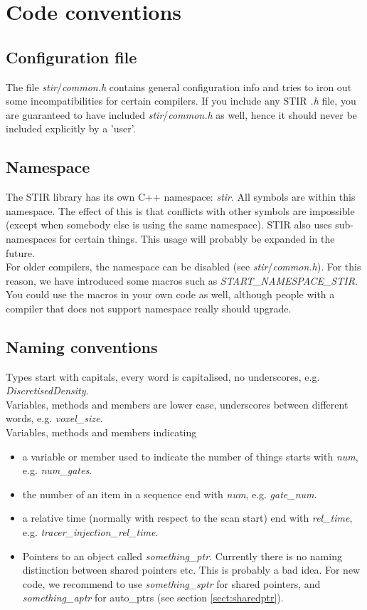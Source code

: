 \documentclass{article}
\begin{document}
\section{
Code conventions}


\subsection{
Configuration file}

The file \textit{stir}/\textit{common.h} contains general configuration 
info and tries to iron out some incompatibilities for certain 
compilers. If you include any STIR \textit{.h} file, you are guaranteed 
to have included \textit{stir}/\textit{common.h} as well, hence it should 
never be included explicitly by a 'user'.

\subsection{
Namespace}

The STIR library has its own C++ namespace: \textit{stir}. All symbols 
are within this namespace. The effect of this is that conflicts 
with other symbols are impossible (except when somebody else 
is using the same namespace). STIR also uses sub-namespaces for 
certain things. This usage will probably be expanded in the future.\\
For older compilers, the namespace can be disabled (see \textit{stir}/\textit{common.h}). 
For this reason, we have introduced some macros such as \textit{START\_NAMESPACE\_STIR.} You 
could use the macros in your own code as well, although people 
with a compiler that does not support namespace really should 
upgrade.

\subsection{
Naming conventions }

Types start with capitals, every word is capitalised, no underscores, 
e.g. \textit{DiscretisedDensity}.\\
Variables, methods and members are lower case, underscores between 
different words, e.g. \textit{voxel\_size}.\\
Variables, methods and members indicating 
\begin{itemize}
\item 
a variable or member used to indicate the number of things starts 
with \textit{num}, e.g. \textit{num\_gates}.
\item 
the number of an item in a sequence end with \textit{num}, e.g. \textit{gate\_num}.
\item 
a relative time (normally with respect to the scan start) end 
with \textit{rel\_time}, e.g. \textit{tracer\_injection\_rel\_time}.
\item 
Pointers to an object called \textit{something\_ptr}. Currently there 
is no naming distinction between shared pointers etc. This is 
probably a bad idea. For new code, we recommend to use \textit{something\_sptr} 
for shared pointers, and \textit{something\_aptr} for auto\_ptrs (see 
section \ref{sect:sharedptr}).
\end{itemize}
\end{document}
